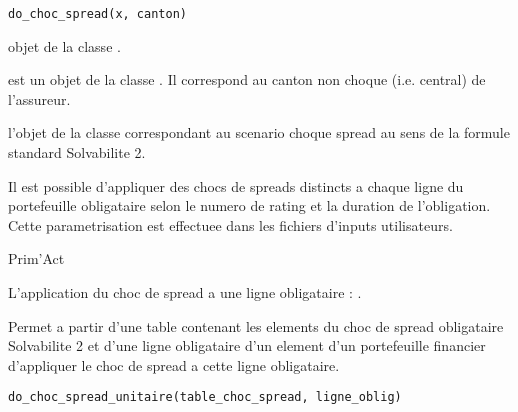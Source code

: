 \documentclass[a4paper]{book}
\begin{document}
%
\begin{Usage}
\begin{verbatim}
do_choc_spread(x, canton)
\end{verbatim}
\end{Usage}
%
\begin{Arguments}
\begin{ldescription}
\item[\code{x}] objet de la classe .

\item[\code{canton}] est un objet de la classe . Il correspond au canton non choque (i.e. central)
de l'assureur.
\end{ldescription}
\end{Arguments}
%
\begin{Value}
 l'objet  de la classe  correspondant au scenario choque
spread au sens de la formule standard Solvabilite 2.
\end{Value}
%
\begin{Note}\relax
Il est possible d'appliquer des chocs de spreads distincts a chaque ligne du portefeuille obligataire
selon le numero de rating et la duration de l'obligation.
Cette parametrisation est effectuee dans les fichiers d'inputs utilisateurs.
\end{Note}
%
\begin{Author}\relax
Prim'Act
\end{Author}
%
\begin{SeeAlso}\relax
L'application du choc de spread a une ligne obligataire : .
\end{SeeAlso}
%
\begin{Description}\relax
{} Permet a partir d'une table contenant les elements du choc de spread obligataire
Solvabilite 2 et d'une ligne obligataire d'un element  d'un portefeuille financier
d'appliquer le choc de spread a cette ligne obligataire.
\end{Description}
%
\begin{Usage}
\begin{verbatim}
do_choc_spread_unitaire(table_choc_spread, ligne_oblig)
\end{verbatim}
\end{Usage}
\end{document}
